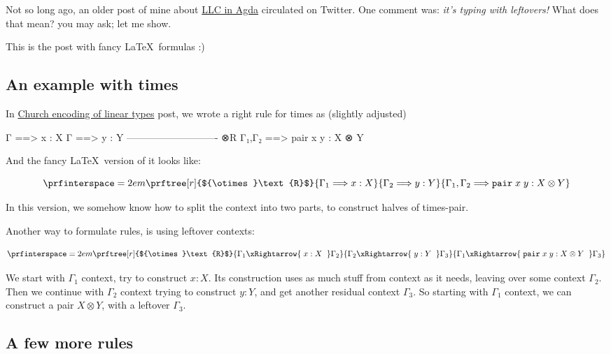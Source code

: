 \documentclass{article}
\begin{document}
Not so long ago, an older post of mine about \href{2018-07-12-llc-in-agda.html}{LLC in Agda} circulated on Twitter.
One comment was: \emph{it's typing with leftovers!} What does that mean? you may ask; let me show.

This is the post with fancy \LaTeX\ formulas :)

\subsection{An example with times}

In \href{2019-06-26-linear-church-encodings.html}{Church encoding of linear types} post,
we wrote a right rule for times as (slightly adjusted)


\begin{code}
 Γ ==> x : X    Γ ==> y : Y
---------------------------- ⊗R
 Γ₁,Γ₂ ==> pair x y : X ⊗ Y
\end{code}

And the fancy \LaTeX\ version of it looks like:

\begin{equation*}
\prfinterspace=2em
\prftree[r]{${\otimes}\text{R}$}{
\Gamma_1 \Longrightarrow x:X
}{
\Gamma_2 \Longrightarrow y:Y
}{
\Gamma_1,\Gamma_2 \Longrightarrow \mathtt{pair}\;x\;y : X \otimes Y
}
\end{equation*}

In this version, we somehow know how to split the context into two parts,
to construct halves of times-pair.

Another way to formulate rules, is using leftover contexts:

\begin{equation*}
\prfinterspace=2em
\prftree[r]{${\otimes}\text{R}$}{
\Gamma_1 \xRightarrow{\displaystyle\;x:X\;\;} \Gamma_2
}{
\Gamma_2 \xRightarrow{\displaystyle\;y:Y\;\;} \Gamma_3
}{
\Gamma_1 \xRightarrow{\displaystyle\;\mathtt{pair}\;x\;y : X \otimes Y\;\;} \Gamma_3
}
\end{equation*}

We start with $\Gamma_1$ context, try to construct $x:X$. Its construction
uses as much stuff from context as it needs, leaving over some context $\Gamma_2$.
Then we continue with $\Gamma_2$ context trying to construct $y:Y$, and get
another residual context $\Gamma_3$. So starting with $\Gamma_1$ context,
we can construct a pair $X \otimes Y$, with a leftover $\Gamma_3$.

\subsection{A few more rules}
\end{document}
